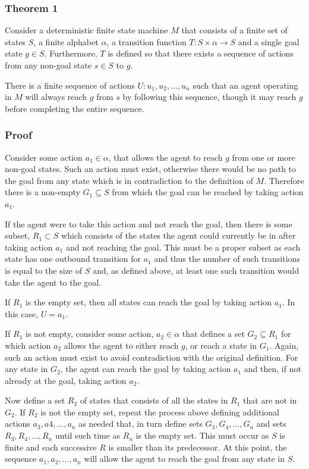 \documentclass[letterpaper]{article} %
\begin{document}
\subsubsection{Theorem 1} Consider a deterministic finite state
machine $M$ that consists of a finite set of states \textit{$S$}, a
finite alphabet \textit{$\alpha$}, a transition function \textit{$T:
S \times \alpha \rightarrow S$} and a single goal state $g \in S$.
Furthermore, $T$ is defined so that there exists a sequence of
actions from any non-goal state $s \in S$ to $g$.

There is a finite sequence of actions $U: u_1, u_2, ..., u_n$ such
that an agent operating in $M$ will always reach $g$ from $s$ by
following this sequence, though it may reach $g$ before completing the
entire sequence.

\subsubsection{Proof} Consider some action $a_1 \in \alpha$, that
allows the agent to reach $g$ from one or more non-goal states.  Such
an action must exist, otherwise there would be no path to the goal
from any state which is in contradiction to the definition of $M$.
Therefore there is a non-empty $G_1 \subseteq S$ from which the goal
can be reached by taking action $a_1$.

If the agent were to take this action and not reach the goal, then
there is some subset, $R_1 \subset S$ which consists of the states the
agent could currently be in after taking action $a_1$ and not reaching
the goal.  This must be a proper subset as each state has one outbound
transition for $a_1$ and thus the number of such transitions is equal
to the size of $S$ and, as defined above, at least one such transition
would take the agent to the goal.

If $R_1$ is the empty set, then all states can reach the goal by taking
action $a_1$.  In this case, $U = a_1$.

If $R_1$ is not empty, consider some action, $a_2 \in \alpha$ that
defines a set $G_2 \subseteq R_1$ for which action $a_2$ allows the
agent to either reach $g$, or reach a state in $G_1$.  Again, such an
action must exist to avoid contradiction with the original definition.
For any state in $G_2$, the agent can reach the goal by taking action
$a_1$ and then, if not already at the goal, taking action $a_2$.


Now define a set $R_2$ of states that consists of all the states in
$R_1$ that are not in $G_2$.  If $R_2$ is not the empty set, repeat
the process above defining additional actions $a_3, a4, ..., a_n$ as
needed that, in turn define sets $G_3, G_4, ..., G_n$ and sets $R_3,
R_4, ..., R_n$ until such time as $R_n$ is the empty set.  This must
occur as $S$ is finite and each successive $R$ is smaller than its
predecessor.  At this point, the sequence $a_1, a_2, ..., a_n$ will
allow the agent to reach the goal from any state in $S$.
\end{document}
